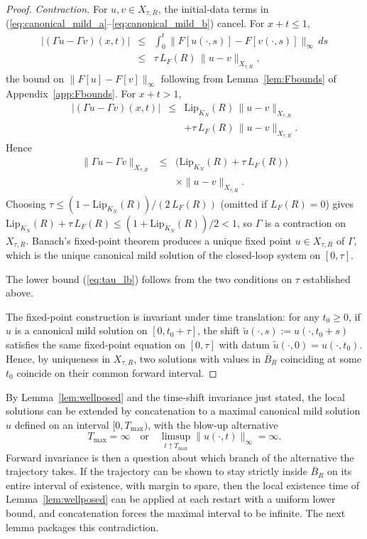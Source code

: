 \documentclass[amsthm]{autart}
\theoremstyle{plain}
\theoremstyle{definition}
\newcommand{\LipKn}{\mathrm{Lip}_{K_N}}
\begin{document}
\begin{proof}
\emph{Contraction.} For $u, v \in X_{\tau, R}$, the initial-data terms in (\ref{eq:canonical_mild_a}--\ref{eq:canonical_mild_b}) cancel. For $x + t \le 1$,
\begin{eqnarray}
|(\Gamma u - \Gamma v)(x, t)| &\le& \int_0^t \|F[u(\cdot, s)] - F[v(\cdot, s)]\|_\infty\, ds \nonumber \\
&\le& \tau\, L_F(R)\, \|u - v\|_{X_{\tau, R}},
\label{eq:Gamma_lip_interior}
\end{eqnarray}
the bound on $\|F[u]-F[v]\|_\infty$ following from Lemma~\ref{lem:Fbounds} of Appendix~\ref{app:Fbounds}. For $x + t > 1$,
\begin{eqnarray}
|(\Gamma u - \Gamma v)(x, t)| &\le& \LipKn(R)\,\|u - v\|_{X_{\tau, R}} \nonumber \\
&& + \tau\, L_F(R)\,\|u - v\|_{X_{\tau, R}}.
\label{eq:Gamma_lip_boundary}
\end{eqnarray}
Hence
\begin{eqnarray}
\|\Gamma u - \Gamma v\|_{X_{\tau, R}} &\le& \bigl(\LipKn(R) + \tau\, L_F(R)\bigr) \nonumber \\
&& \times \|u - v\|_{X_{\tau, R}}.
\label{eq:Gamma_contraction}
\end{eqnarray}
Choosing $\tau \le (1 - \LipKn(R))/(2\, L_F(R))$ (omitted if $L_F(R) = 0$) gives $\LipKn(R) + \tau\, L_F(R) \le (1 + \LipKn(R))/2 < 1$, so $\Gamma$ is a contraction on $X_{\tau, R}$. Banach's fixed-point theorem produces a unique fixed point $u \in X_{\tau, R}$ of $\Gamma$, which is the unique canonical mild solution of the closed-loop system on $[0, \tau]$.

The lower bound (\ref{eq:tau_lb}) follows from the two conditions on $\tau$ established above.

The fixed-point construction is invariant under time translation: for any $t_0 \ge 0$, if $u$ is a canonical mild solution on $[0, t_0 + \tau]$, the shift $\tilde u(\cdot, s) := u(\cdot, t_0 + s)$ satisfies the same fixed-point equation on $[0, \tau]$ with datum $\tilde u(\cdot, 0) = u(\cdot, t_0)$. Hence, by uniqueness in $X_{\tau, R}$, two solutions with values in $\overline B_R$ coinciding at some $t_0$ coincide on their common forward interval.
\end{proof}

By Lemma~\ref{lem:wellposed} and the time-shift invariance just stated, the local solutions can be extended by concatenation to a maximal canonical mild solution $u$ defined on an interval $[0, T_{\max})$, with the blow-up alternative
\begin{equation}
T_{\max} = \infty \quad \text{or} \quad \limsup_{t \uparrow T_{\max}} \|u(\cdot, t)\|_\infty = \infty.
\label{eq:blowup_alternative}
\end{equation}
Forward invariance is then a question about which branch of the alternative the trajectory takes. If the trajectory can be shown to stay strictly inside $\overline B_R$ on its entire interval of existence, with margin to spare, then the local existence time of Lemma~\ref{lem:wellposed} can be applied at each restart with a uniform lower bound, and concatenation forces the maximal interval to be infinite. The next lemma packages this contradiction.
\end{document}
